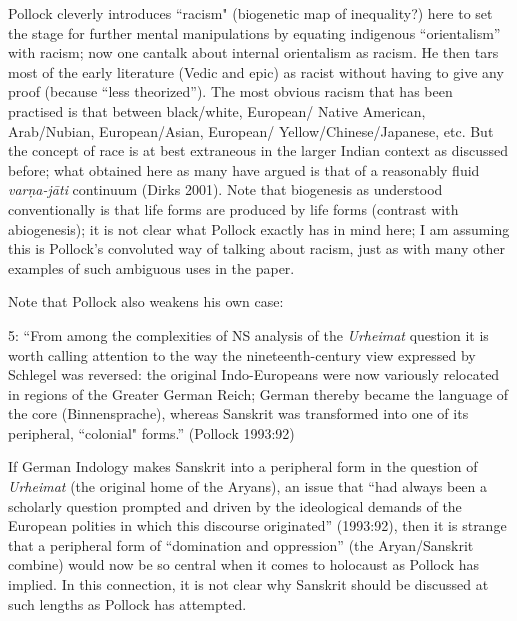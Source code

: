 {\begin{enumerate}
Pollock cleverly introduces “racism" (biogenetic map of inequality?) here to set the stage for further mental manipulations by equating indigenous “orientalism” with racism; now one can\break talk about internal orientalism as racism. He then tars most of the early literature (Vedic and epic) as racist without having to give any proof (because “less theorized”). The most obvious racism that has been practised is that between black/white, European/ Native American, Arab/Nubian, European/Asian, European/ Yellow/Chinese/Japanese, etc. But the concept of race is at best extraneous in the larger Indian context as discussed before; what obtained here as many have argued is that of a reasonably fluid {\sl varṇa-jāti} continuum (Dirks 2001). Note that biogenesis as understood conventionally is that life forms are  produced by life forms (contrast with abiogenesis); it is not clear what Pollock exactly has in mind here; I am assuming this is Pollock’s convoluted way of talking about racism, just as with many other examples of such ambiguous uses in the paper.

Note that Pollock also weakens his own case:
\begin{myquote}
5: “From among the complexities of NS analysis of the {\sl Urheimat} question it is worth calling attention to the way the nineteenth-century view expressed by Schlegel was reversed: the original Indo-Europeans were now variously relocated in regions of the Greater German Reich; German thereby became the language of the core (Binnensprache), whereas Sanskrit was transformed into one of its peripheral, ``colonial" forms.” \hfill 	(Pollock 1993:92)
\end{myquote}
\medskip

If German Indology makes Sanskrit into a peripheral form in the question of {\sl Urheimat} (the original home of the Aryans), an issue that “had always been a scholarly question prompted and driven by the ideological demands of the European polities in which this discourse originated” (1993:92), then it is strange that a peripheral form of “domination and oppression” (the Aryan/Sanskrit combine) would now be so central when it comes to holocaust as Pollock has implied. In this connection, it is not clear why Sanskrit should be discussed at such lengths as Pollock has attempted.


\end{enumerate}}
